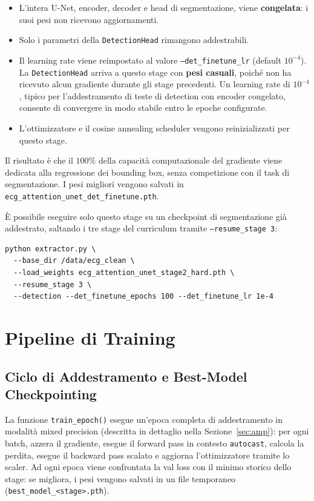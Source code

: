 \begin{itemize}
    \item L'intera U-Net, encoder, decoder e head di segmentazione, viene \textbf{congelata}: i suoi pesi non ricevono aggiornamenti.
    \item Solo i parametri della \texttt{DetectionHead} rimangono addestrabili.
    \item Il learning rate viene reimpostato al valore \texttt{--det\_finetune\_lr} (default $10^{-4}$). La \texttt{DetectionHead} arriva a questo stage con \textbf{pesi casuali}, poiché non ha ricevuto alcun gradiente durante gli stage precedenti. Un learning rate di $10^{-4}$, tipico per l'addestramento di teste di detection con encoder congelato, consente di convergere in modo stabile entro le epoche configurate.
    \item L'ottimizzatore e il cosine annealing scheduler vengono reinizializzati per questo stage.
\end{itemize}

Il risultato è che il $100\%$ della capacità computazionale del gradiente viene dedicata alla regressione dei bounding box, senza competizione con il task di segmentazione. I pesi migliori vengono salvati in \texttt{ecg\_attention\_unet\_det\_finetune.pth}.

È possibile eseguire solo questo stage su un checkpoint di segmentazione già addestrato, saltando i tre stage del curriculum tramite \texttt{--resume\_stage 3}:

\begin{verbatim}
python extractor.py \
  --base_dir /data/ecg_clean \
  --load_weights ecg_attention_unet_stage2_hard.pth \
  --resume_stage 3 \
  --detection --det_finetune_epochs 100 --det_finetune_lr 1e-4
\end{verbatim}

\section{Pipeline di Training}

\subsection{Ciclo di Addestramento e Best-Model Checkpointing}

La funzione \texttt{train\_epoch()} esegue un'epoca completa di addestramento in modalità mixed precision (descritta in dettaglio nella Sezione~\ref{sec:amp}): per ogni batch, azzera il gradiente, esegue il forward pass in contesto \texttt{autocast}, calcola la perdita, esegue il backward pass scalato e aggiorna l'ottimizzatore tramite lo scaler. Ad ogni epoca viene confrontata la val loss con il minimo storico dello stage: se migliora, i pesi vengono salvati in un file temporaneo (\texttt{best\_model\_<stage>.pth}).

